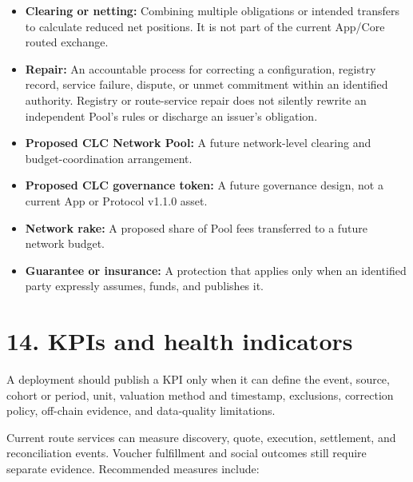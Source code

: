 \documentclass[11pt]{article}
\begin{document}
\begin{itemize}[leftmargin=*]
\item \textbf{Clearing or netting:} Combining multiple obligations or intended transfers to calculate reduced net positions. It is not part of the current App/Core routed exchange.
\item \textbf{Repair:} An accountable process for correcting a configuration, registry record, service failure, dispute, or unmet commitment within an identified authority. Registry or route-service repair does not silently rewrite an independent Pool's rules or discharge an issuer's obligation.
\item \textbf{Proposed CLC Network Pool:} A future network-level clearing and budget-coordination arrangement.
\item \textbf{Proposed CLC governance token:} A future governance design, not a current App or Protocol v1.1.0 asset.
\item \textbf{Network rake:} A proposed share of Pool fees transferred to a future network budget.
\item \textbf{Guarantee or insurance:} A protection that applies only when an identified party expressly assumes, funds, and publishes it.
\end{itemize}

\section*{14. KPIs and health indicators}

A deployment should publish a KPI only when it can define the event, source, cohort or period, unit, valuation method and timestamp, exclusions, correction policy, off-chain evidence, and data-quality limitations.

Current route services can measure discovery, quote, execution, settlement, and reconciliation events. Voucher fulfillment and social outcomes still require separate evidence. Recommended measures include:
\end{document}
